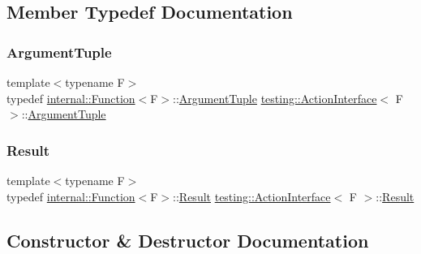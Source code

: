 \subsection{Member Typedef Documentation}
\mbox{\label{classtesting_1_1ActionInterface_af72720d864da4d606629e83edc003511}} 
\subsubsection{\texorpdfstring{ArgumentTuple}{ArgumentTuple}}
{\footnotesize\ttfamily template$<$typename F$>$ \\
typedef \mbox{\hyperlink{structtesting_1_1internal_1_1Function}{internal\+::\+Function}}$<$F$>$\+::\mbox{\hyperlink{classtesting_1_1ActionInterface_af72720d864da4d606629e83edc003511}{Argument\+Tuple}} \mbox{\hyperlink{classtesting_1_1ActionInterface}{testing\+::\+Action\+Interface}}$<$ F $>$\+::\mbox{\hyperlink{classtesting_1_1ActionInterface_af72720d864da4d606629e83edc003511}{Argument\+Tuple}}}

\mbox{\label{classtesting_1_1ActionInterface_a7477de2fe3e4e01c59db698203acaee7}} 
\subsubsection{\texorpdfstring{Result}{Result}}
{\footnotesize\ttfamily template$<$typename F$>$ \\
typedef \mbox{\hyperlink{structtesting_1_1internal_1_1Function}{internal\+::\+Function}}$<$F$>$\+::\mbox{\hyperlink{classtesting_1_1ActionInterface_a7477de2fe3e4e01c59db698203acaee7}{Result}} \mbox{\hyperlink{classtesting_1_1ActionInterface}{testing\+::\+Action\+Interface}}$<$ F $>$\+::\mbox{\hyperlink{classtesting_1_1ActionInterface_a7477de2fe3e4e01c59db698203acaee7}{Result}}}



\subsection{Constructor \& Destructor Documentation}
\mbox{\label{classtesting_1_1ActionInterface_a0f1d44e4c669a9cae5ee5b28419a6f52}} 
